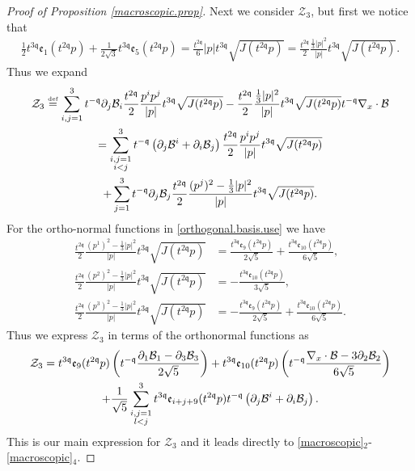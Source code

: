 \documentclass[reqno]{amsart}
\newcommand{\eqdef }{\overset{\mbox{\tiny{def}}}{=}}
\newcommand{\pv}{p}
\newcommand{\qq}{\mathfrak{q}}
\newcommand{\tmq}{t^{-\qq}}
\newcommand{\tqq}{t^{2\qq}}
\newcommand{\tTq}{t^{3\qq}}
\theoremstyle{definition}
\numberwithin{equation}{section}
\numberwithin{theorem}{section}
\begin{document}
\begin{proof}[Proof of Proposition \ref{macroscopic.prop}]
Next we consider $\mathcal{Z}_3$, but first we notice that
\begin{align*}
     \frac{1}{2}  \tTq \mathfrak{e}_1(\tqq \pv)
  +
  \frac{1}{2\sqrt{3}} 
\tTq \mathfrak{e}_5(\tqq \pv)
= \frac{\tqq}{6}|p| \tTq\sqrt{J(\tqq p)}
= \frac{\tqq}{2}\frac{\frac13|p|^2}{|p|} \tTq\sqrt{J(\tqq p)}. 
\end{align*}
Thus we expand
\begin{multline*}
\mathcal{Z}_3 \eqdef 
 \sum_{i,j=1}^{3}  \tmq\partial_j \mathcal{B}_i \frac{\tqq}{2}\frac{p^ip^j}{{|\pv|}} \tTq\sqrt{J(\tqq\pv)}
-
\frac{\tqq}{2}\frac{\frac13|p|^2}{|p|} \tTq\sqrt{J(\tqq p)}
\tmq\nabla_x \cdot \mathcal{B}
    \\
    =
     \sum_{\substack{i,j=1 \\ i<j}}^3
     \tmq\left(\partial_j \mathcal{B}^i+\partial_i \mathcal{B}_{j} \right) \frac{\tqq}{2}\frac{p^ip^j}{{|\pv|}} \tTq\sqrt{J(\tqq\pv)}
     \\
     +
     \sum_{j=1}^{3}\tmq\partial_j \mathcal{B}_j \frac{\tqq}{2}\frac{(p^j)^2-\frac13|p|^2}{{|\pv|}} \tTq\sqrt{J(\tqq\pv)}.
\end{multline*}
For the ortho-normal functions in \eqref{orthogonal.basis.use} we have 
\begin{align*}
       \frac{\tqq}{2}\frac{(p^1)^2-\frac13|p|^2}{{|\pv|}} \tTq\sqrt{J(\tqq\pv)}
    & = \frac{\tTq \mathfrak{e}_{9}(\tqq \pv)}{2\sqrt{5}} + \frac{\tTq \mathfrak{e}_{10}(\tqq \pv)}{6\sqrt{5}},
    \\ 
           \frac{\tqq}{2}\frac{(p^2)^2-\frac13|p|^2}{{|\pv|}} \tTq\sqrt{J(\tqq\pv)}
    & = -  \frac{\tTq \mathfrak{e}_{10}(\tqq \pv)}{3\sqrt{5}},
    \\ 
           \frac{\tqq}{2}\frac{(p^3)^2-\frac13|p|^2}{{|\pv|}} \tTq\sqrt{J(\tqq\pv)}
    & = -\frac{\tTq \mathfrak{e}_{9}(\tqq \pv)}{2\sqrt{5}} + \frac{\tTq \mathfrak{e}_{10}(\tqq \pv)}{6\sqrt{5}}.
\end{align*}
Thus we express $\mathcal{Z}_3$ in terms of the orthonormal functions as 
\begin{multline}\notag 
\mathcal{Z}_3 =
\tTq \mathfrak{e}_{9}(\tqq \pv) \left(\tmq\frac{\partial_1 \mathcal{B}_1 - \partial_3 \mathcal{B}_3}{2\sqrt{5}} \right)
+
\tTq \mathfrak{e}_{10}(\tqq \pv) \left(\tmq\frac{\nabla_x\cdot \mathcal{B}-3\partial_2 \mathcal{B}_2}{6\sqrt{5}} \right)
 \\
 +
 \frac{1}{\sqrt{5}}
 \sum_{\substack{i,j=1 \\ l<j}}^3 \tTq \mathfrak{e}_{i+j+9}(\tqq \pv)
 \tmq\left(\partial_j \mathcal{B}^i+\partial_i \mathcal{B}_{j} \right). 
\end{multline}
This is our main expression for $\mathcal{Z}_3$ and it leads directly to \eqref{macroscopic}$_2$-\eqref{macroscopic}$_4$.



\end{proof}
\end{document}
